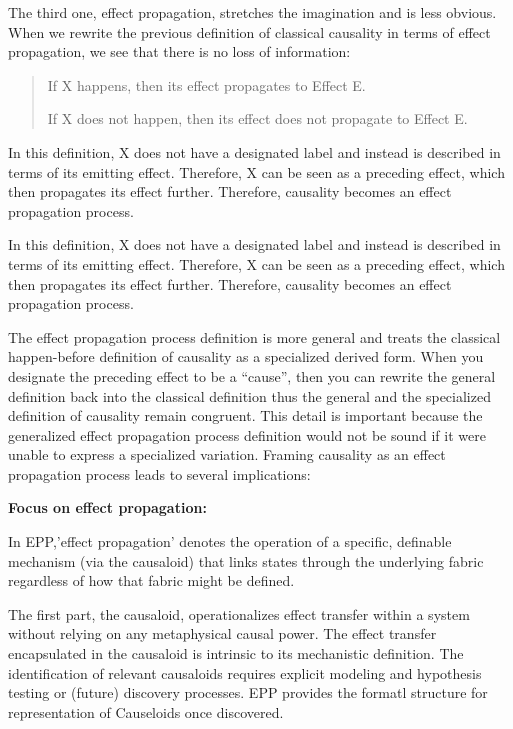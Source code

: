 \documentclass{article}
\begin{document}
The third one, effect propagation, stretches the imagination and is less obvious. When we rewrite the previous definition of classical causality in terms of effect propagation, we see that there is no loss of information:

\begin{quote}
    If X happens, then its effect propagates to Effect E.
    
    If X does not happen, then its effect does not propagate to Effect E.
\end{quote}

In this definition, X does not have a designated label and instead is described in terms of its emitting effect. Therefore, X can be seen as a preceding effect, which then propagates its effect further. Therefore, causality becomes an effect propagation process. 

In this definition, X does not have a designated label and instead is described in terms of its emitting effect. Therefore, X can be seen as a preceding effect, which then propagates its effect further. Therefore, causality becomes an effect propagation process.

The effect propagation process definition is more general and treats the classical happen-before definition of causality as a specialized derived form. When you designate the preceding effect to be a “cause”, then you can rewrite the general definition back into the classical definition thus the general and the specialized definition of causality remain congruent. This detail is important because the generalized effect propagation process definition would not be sound if it were unable to express a specialized variation. Framing causality as an effect propagation process leads to several implications:


\textbf{Focus on effect propagation:}

In EPP,'effect propagation' denotes the operation of a specific, definable mechanism (via the causaloid) that links states through the underlying fabric regardless of how that fabric might be defined.

The first part, the causaloid, operationalizes effect transfer within a system without relying on any metaphysical causal power. The effect transfer encapsulated in the causaloid is  intrinsic to its mechanistic definition. The identification of relevant causaloids requires explicit modeling and hypothesis testing or (future) discovery processes. EPP provides the formatl structure for representation of Causeloids once discovered.
\end{document}
